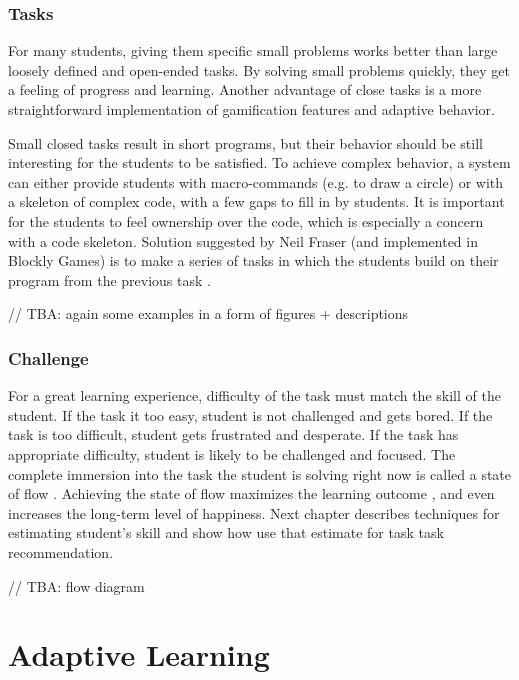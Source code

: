 \documentclass[
    digital,
    color,
    11pt,
    nocover,
    table,  %
    nolof,  %
    nolot,  %
    microtype,
]{fithesis3}
\begin{document}
\subsection{Tasks}
\label{sec:motivation.tasks}
For many students, giving them specific small problems works better
  than large loosely defined and open-ended tasks.
By solving small problems quickly,
  they get a feeling of progress and learning.
Another advantage of close tasks
  is a more straightforward implementation of gamification features and adaptive behavior.

Small closed tasks result in short programs,
  but their behavior should be still interesting for the students to be satisfied.
To achieve complex behavior,
  a system can either provide students with macro-commands (e.g. to draw a circle)
  or with a skeleton of complex code, with a few gaps to fill in by students.
It is important for the students to feel ownership over the code,
  which is especially a concern with a code skeleton.
Solution suggested by Neil Fraser (and implemented in Blockly Games)
  is to make a series of tasks in which the students
  build on their program from the previous task
  \cite{blockly-10-things}.

// TBA: again some examples in a form of figures + descriptions



\subsection{Challenge}
\label{sec:motivation.challenge}
For a great learning experience,
  difficulty of the task must match the skill of the student.
If the task it too easy,
  student is not challenged and gets bored.
If the task is too difficult,
  student gets frustrated and desperate.
If the task has appropriate difficulty,
  student is likely to be challenged and focused.
The complete immersion into the task the student is solving right now is called
  a state of flow \cite{flow}.
Achieving the state of flow maximizes the learning outcome \cite{adaptive-practice},
  and even increases the long-term level of happiness. %
Next chapter describes techniques for estimating student’s skill
  and show how use that estimate for task task recommendation.

// TBA: flow diagram


\chapter{Adaptive Learning}
\label{chap:adaptive-learning}
\end{document}

